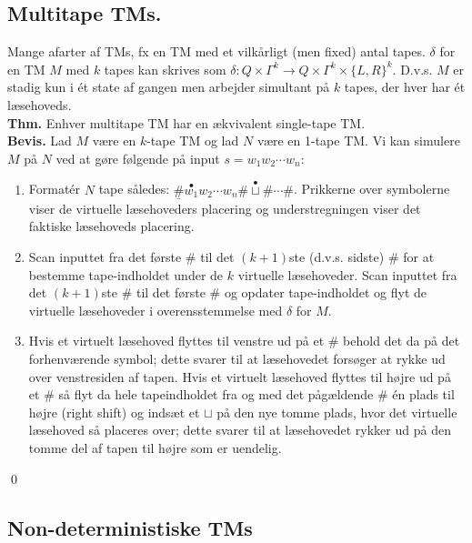 \subsection*{Multitape TMs.} 

Mange afarter af TMs, fx en TM med et vilkårligt (men fixed) antal tapes. $\delta$ for en TM $M$ med $k$ tapes kan skrives som $\delta: Q \times \Gamma^k \rightarrow Q \times \Gamma^k \times \{L,R\}^k$. D.v.s. $M$ er stadig kun i ét state af gangen men arbejder simultant på $k$ tapes, der hver har ét læsehoveds. \\

\textbf{Thm.} Enhver multitape TM har en ækvivalent single-tape TM.\\

\textbf{Bevis.} Lad $M$ være en $k$-tape TM og lad $N$ være en 1-tape TM. Vi kan simulere $M$ på $N$ ved at gøre følgende på input $s=w_1w_2 \cdots w_n$:
\begin{enumerate}
	\item Formatér $N$ tape således: $\underline{\#}\stackrel{\bullet}{w_1}w_2\cdots w_n \#\stackrel{\bullet}{\sqcup}\# \cdots \#$. Prikkerne over symbolerne viser de virtuelle læsehoveders placering og understregningen viser det faktiske læsehoveds placering.
	\item Scan inputtet fra det første $\#$ til det $(k+1)$ste (d.v.s. sidste) $\#$ for at bestemme tape-indholdet under de $k$ virtuelle læsehoveder. Scan inputtet fra det $(k+1)$ste $\#$ til det første $\#$ og opdater tape-indholdet og flyt de virtuelle læsehoveder i overensstemmelse med $\delta$ for $M$. 
	\item Hvis et virtuelt læsehoved flyttes til venstre ud på et $\#$ behold det da på det forhenværende symbol; dette svarer til at læsehovedet forsøger at rykke ud over venstresiden af tapen. Hvis et virtuelt læsehoved flyttes til højre ud på et $\#$ så flyt da hele tapeindholdet fra og med det pågældende $\#$ én plads til højre (right shift) og indsæt et $\sqcup$ på den nye tomme plads, hvor det virtuelle læsehoved så placeres over; dette svarer til at læsehovedet rykker ud på den tomme del af tapen til højre som er uendelig.  
\end{enumerate}
\begin{flushright}
	\qed
\end{flushright}

\subsection*{Non-deterministiske TMs}

